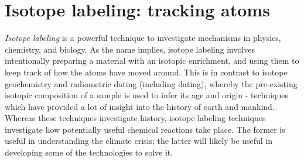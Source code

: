 \section{Isotope labeling: tracking atoms}\label{sec:isotopes}


\textit{Isotope labeling} is a powerful technique to investigate mechanisms in physics, chemistry, and biology. As the name implies, isotope labeling involves intentionally preparing a material with an isotopic enrichment, and using them to keep track of how the atoms have moved around. This is in contrast to isotope geochemistry\cite{Harnung2012} and radiometric dating (including  dating)\cite{Taylor2014, Allegre2008}, whereby the pre-existing isotopic composition of a sample is used to infer its age and origin - techniques which have provided a lot of insight into the history of earth and mankind. Whereas these techniques investigate history, isotope labeling techniques investigate how potentially useful chemical reactions take place. The former is useful in understanding the climate crisis; the latter will likely be useful in developing some of the technologies to solve it.

